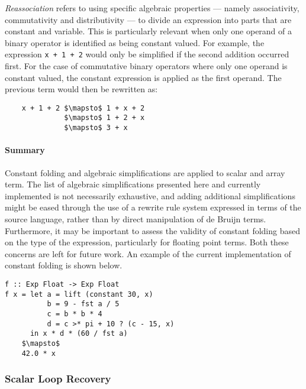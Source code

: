 \emph{Reassociation} refers to using specific algebraic properties --- namely
associativity, commutativity and distributivity --- to divide an expression into
parts that are constant and variable.
This is particularly relevant when only one operand of a binary
operator is identified as being constant valued. For example, the expression
\lstinline{x + 1 + 2} would only be simplified if the second addition occurred
first. For the case of commutative binary operators where only one operand is
constant valued, the constant expression is applied as the first operand. The
previous term would then be rewritten as:
%
\begin{lstlisting}[style=Haskell,numbers=none,mathescape]
%\bf$\langle$ algebraic reassociation $\rangle$%
    x + 1 + 2 $\mapsto$ 1 + x + 2
              $\mapsto$ 1 + 2 + x
              $\mapsto$ 3 + x
\end{lstlisting}


\paragraph{Summary}

Constant folding and algebraic simplifications are applied to scalar and array
term. The list of algebraic simplifications presented here and currently
implemented is not necessarily exhaustive, and adding additional simplifications
might be eased through the use of a rewrite rule system expressed in terms of
the source language, rather than by direct manipulation of de Bruijn terms.
Furthermore, it may be important to assess the validity of constant folding
based on the type of the expression, particularly for floating point
terms. Both these concerns are left for future work. An example of the current
implementation of constant folding is shown below.

\begin{lstlisting}[style=Haskell,mathescape,caption={Example of constant expression evaluation}]
f :: Exp Float -> Exp Float
f x = let a = lift (constant 30, x)
          b = 9 - fst a / 5
          c = b * b * 4
          d = c >* pi + 10 ? (c - 15, x)
      in x * d * (60 / fst a)
    $\mapsto$
    42.0 * x
\end{lstlisting}


\subsubsection{Scalar Loop Recovery}


